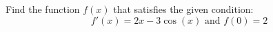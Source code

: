 \documentclass[11pt]{exam}
\begin{document}
\begin{questions}
\begin{parts}
\end{parts}

\newpage
\question[6] Find the function $f(x)$ that satisfies the given condition:
$$f'(x)=2x-3\cos(x)\text{ and }f(0)=2$$
\vfill


\end{questions}
\end{document}
